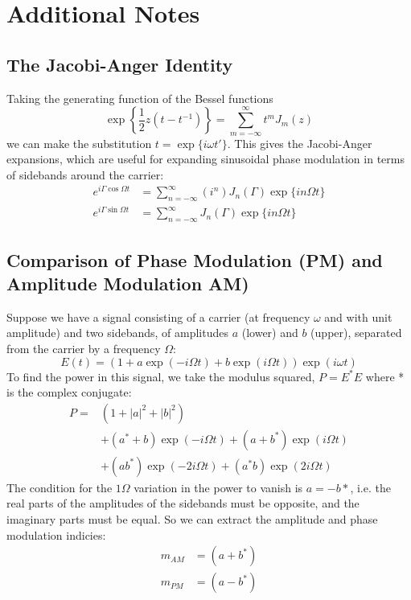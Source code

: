 \chapter{Additional Notes}
\label{chapter7}
\section{The Jacobi-Anger Identity}
\label{sec:jacobi-anger}
Taking the generating function of the Bessel functions
\begin{equation}
\exp\left\{\frac{1}{2} z \left(t - t^{-1}\right)\right\} = \sum_{m=-\infty}^\infty t^m J_m(z)
\end{equation}
we can make the substitution $t = \exp \{i \omega t'\}$.
This gives the Jacobi-Anger expansions, which are useful for expanding sinusoidal phase modulation in terms of sidebands around the carrier:
\begin{align}
e^{i\Gamma\cos\Omega t} & = \sum_{n=-\infty}^{\infty} \left(i^n\right)  J_n(\Gamma) \exp\{i n \Omega t\} \\
e^{i\Gamma\sin\Omega t} & = \sum_{n=-\infty}^{\infty} J_n(\Gamma) \exp\{i n \Omega t\}
\end{align}

\section{Comparison of Phase Modulation (PM) and Amplitude Modulation AM)}
\label{sec:am-vs-pm}
%
Suppose we have a signal consisting of a carrier (at frequency $\omega$ and
with unit amplitude) and two sidebands, of amplitudes $a$ (lower) and $b$
(upper), separated from the carrier by a frequency $\Omega$:
%
\begin{equation}
E(t) = \left(1 + a \exp(-i \Omega t) + b \exp(i \Omega t)\right)
\exp(i \omega t)
\end{equation}
%
To find the power in this signal, we take the
modulus squared, $P = E^*E$ where * is the complex conjugate:
%
\begin{equation}
\begin{split}
P = & \left(1 + |a|^2 + |b|^2\right) \\
    & + \left(a^* + b\right) \exp(-i \Omega t) + \left(a + b^*\right) \exp(i \Omega t) \\
    & + \left(ab^*\right) \exp(-2 i \Omega t) + \left(a^*b\right) \exp(2 i \Omega t)
\end{split}
\end{equation}
%
The condition for the $1\Omega$ variation in the power to vanish is
$a=-b*$, i.e. the real parts of the amplitudes of the sidebands must
be opposite, and the imaginary parts must be equal. So we can extract
the amplitude and phase modulation indicies:
%
\begin{equation}
\begin{split}
m_{AM} &= (a + b^*)\\
m_{PM} &= (a - b^*)
\end{split}
\end{equation}


